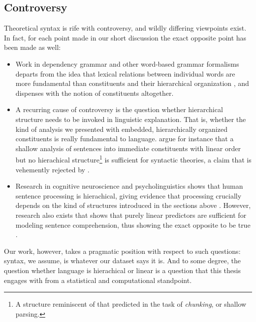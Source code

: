 \subsection{Controversy}
Theoretical syntax is rife with controversy, and wildly differing viewpoints exist. In fact, for each point made in our short discussion the exact opposite point has been made as well:

\begin{itemize}
  \item Work in dependency grammar and other word-based grammar formalisms departs from the idea that lexical relations between individual words are more fundamental than constituents and their hierarchical organization \citep{tesniere1959elements,nivre2005dependency,hudson2010introduction}, and dispenses with the notion of constituents altogether.

  \item A recurring cause of controversy is the question whether hierarchical structure needs to be invoked in linguistic explanation. That is, whether the kind of analysis we presented with embedded, hierarchically organized constituents is really fundamental to language. \citet{frank2012hierarchical} argue for instance that a shallow analysis of sentences into immediate constituents with linear order but no hierachical structure\footnote{A structure reminiscent of that predicted in the task of \textit{chunking}, or shallow parsing.} is sufficient for syntactic theories, a claim that is vehemently rejected by \citet{everaert2015structures}.

  \item Research in cognitive neuroscience and psycholinguistics shows that human sentence processing is hierachical, giving evidence that processing crucially depends on the kind of structures introduced in the sections above \citep{hale2001earley,levy2008expectation,brennan2016abstract}. However, research also exists that shows that purely linear predictors are sufficient for modeling sentence comprehension, thus showing the exact opposite to be true \citep{conway2008neurocognitive,gillespie2011hierarchy,christiansen2012similar,gillespie2013against,frank2012hierarchical}.
\end{itemize}
Our work, however, takes a pragmatic position with respect to such questions: syntax, we assume, is whatever our dataset says it is. And to some degree, the question whether language is hierachical or linear is a question that this thesis engages with from a statistical and computational standpoint.


